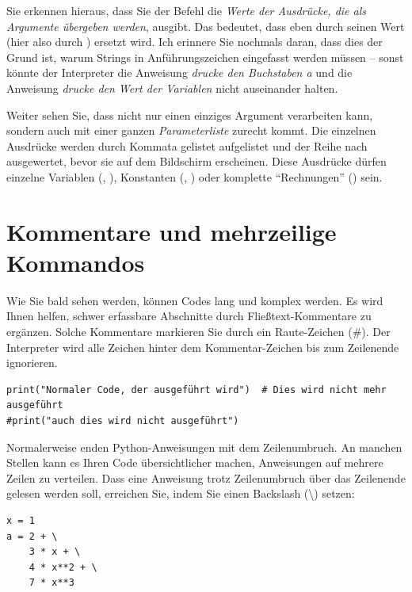 Sie erkennen hieraus, dass Sie der Befehl  die \emph{Werte der Ausdrücke, die als Argumente übergeben werden}, ausgibt. Das bedeutet, dass  eben durch seinen Wert (hier also durch ) ersetzt wird. Ich erinnere Sie nochmals daran, dass dies der Grund ist, warum Strings in Anführungszeichen eingefasst werden müssen -- sonst könnte der Interpreter die Anweisung \emph{drucke den Buchstaben a} und die Anweisung \emph{drucke den Wert der Variablen } nicht auseinander halten.

Weiter sehen Sie, dass  nicht nur einen einziges Argument verarbeiten kann, sondern auch mit einer ganzen \emph{Parameterliste} zurecht kommt. Die einzelnen Ausdrücke werden durch Kommata gelistet aufgelistet und der Reihe nach ausgewertet, bevor sie auf dem Bildschirm erscheinen. Diese Ausdrücke dürfen einzelne Variablen (, ), Konstanten (, ) oder komplette \enquote{Rechnungen} () sein.



\section{Kommentare und mehrzeilige Kommandos}
Wie Sie bald sehen werden, können Codes lang und komplex werden. Es wird Ihnen helfen, schwer erfassbare Abschnitte durch Fließtext-Kommentare zu ergänzen. Solche Kommentare markieren Sie durch ein Raute-Zeichen (\#). Der Interpreter wird alle Zeichen hinter dem Kommentar-Zeichen bis zum Zeilenende ignorieren.

\begin{codebox}
\begin{verbatim}
print("Normaler Code, der ausgeführt wird")  # Dies wird nicht mehr ausgeführt
#print("auch dies wird nicht ausgeführt")
\end{verbatim}
\end{codebox}

Normalerweise enden Python-Anweisungen mit dem Zeilenumbruch. An manchen Stellen kann es Ihren Code übersichtlicher machen, Anweisungen auf mehrere Zeilen zu verteilen. Dass eine Anweisung trotz Zeilenumbruch über das Zeilenende gelesen werden soll, erreichen Sie, indem Sie einen Backslash (\textbackslash) setzen:

\begin{codebox}
\begin{verbatim}
x = 1
a = 2 + \
    3 * x + \
    4 * x**2 + \
    7 * x**3
\end{verbatim}
\end{codebox}


